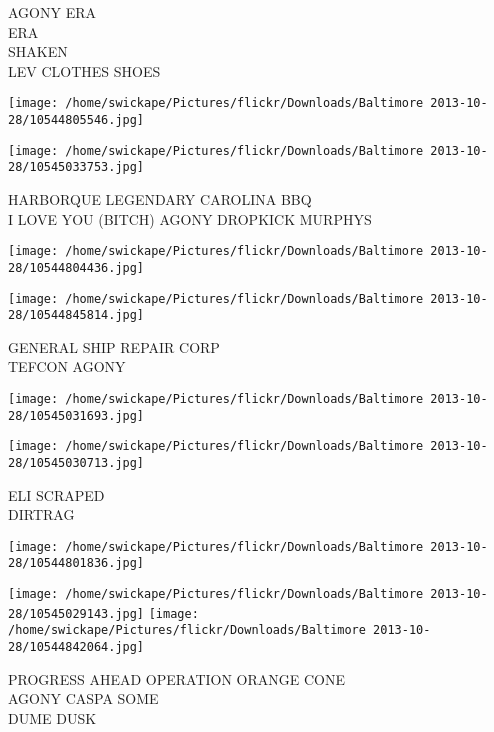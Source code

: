 \documentclass[10pt,letterpaper]{article}
\begin{document}
AGONY ERA\\
ERA\\
SHAKEN\\
LEV CLOTHES SHOES\\
\pagebreak

\texttt{[image: /home/swickape/Pictures/flickr/Downloads/Baltimore 2013-10-28/10544805546.jpg]}

\vspace{0.25in}
\texttt{[image: /home/swickape/Pictures/flickr/Downloads/Baltimore 2013-10-28/10545033753.jpg]}

HARBORQUE LEGENDARY CAROLINA BBQ\\
I LOVE YOU (BITCH) AGONY DROPKICK MURPHYS\\
\pagebreak

\texttt{[image: /home/swickape/Pictures/flickr/Downloads/Baltimore 2013-10-28/10544804436.jpg]}

\vspace{0.25in}
\texttt{[image: /home/swickape/Pictures/flickr/Downloads/Baltimore 2013-10-28/10544845814.jpg]}

GENERAL SHIP REPAIR CORP\\
TEFCON AGONY\\
\pagebreak

\texttt{[image: /home/swickape/Pictures/flickr/Downloads/Baltimore 2013-10-28/10545031693.jpg]}

\vspace{0.25in}
\texttt{[image: /home/swickape/Pictures/flickr/Downloads/Baltimore 2013-10-28/10545030713.jpg]}

ELI SCRAPED\\
DIRTRAG\\
\pagebreak

\texttt{[image: /home/swickape/Pictures/flickr/Downloads/Baltimore 2013-10-28/10544801836.jpg]}

\vspace{0.25in}
\texttt{[image: /home/swickape/Pictures/flickr/Downloads/Baltimore 2013-10-28/10545029143.jpg]}
\texttt{[image: /home/swickape/Pictures/flickr/Downloads/Baltimore 2013-10-28/10544842064.jpg]}

PROGRESS AHEAD OPERATION ORANGE CONE\\
AGONY CASPA SOME\\
DUME DUSK\\
\pagebreak
\end{document}
